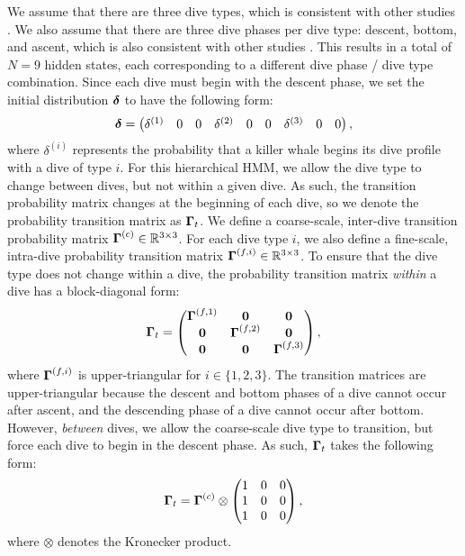 We assume that there are three dive types, which is consistent with other studies \citep[e.g.,][]{Barajas:2017}. We also assume that there are three dive phases per dive type: descent, bottom, and ascent, which is also consistent with other studies \citep[e.g.,][]{Vivant:2014}. This results in a total of $N = 9$ hidden states, each corresponding to a different dive phase / dive type combination.
%
Since each dive must begin with the descent phase, we set the initial distribution $\boldsymbol{\delta}$ to have the following form:
%
\begin{equation}
    \boldsymbol{\delta} = \begin{pmatrix} \delta^{(1)} & 0 & 0 & \delta^{(2)} & 0 & 0 & \delta^{(3)} & 0 & 0 \end{pmatrix},
    \label{eqn:delta_case_study}
\end{equation}
%
where $\delta^{(i)}$ represents the probability that a killer whale begins its dive profile with a dive of type $i$. 
%
For this hierarchical HMM, we allow the dive type to change between dives, but not within a given dive. As such, the transition probability matrix changes at the beginning of each dive, so we denote the probability transition matrix as $\boldsymbol{\Gamma}_t$. We define a coarse-scale, inter-dive transition probability matrix $\boldsymbol{\Gamma}^{(c)} \in \mathbb{R}^{3 \times 3}$. For each dive type $i$, we also define a fine-scale, intra-dive probability transition matrix $\boldsymbol{\Gamma}^{(f,i)} \in \mathbb{R}^{3 \times 3}$. 
%
To ensure that the dive type does not change within a dive, the probability transition matrix \textit{within} a dive has a block-diagonal form:
%
\begin{equation}
    \boldsymbol{\Gamma}_t = 
    \begin{pmatrix}
        \boldsymbol{\Gamma}^{(f,1)} & \mathbf{0} & \mathbf{0} \\
        \mathbf{0} & \boldsymbol{\Gamma}^{(f,2)} & \mathbf{0} \\
        \mathbf{0} & \mathbf{0} & \boldsymbol{\Gamma}^{(f,3)} \\
    \end{pmatrix},
\end{equation}
%
where $\boldsymbol{\Gamma}^{(f,i)}$ is upper-triangular for $i \in \{1,2,3\}$. The transition matrices are upper-triangular because the descent and bottom phases of a dive cannot occur after ascent, and the descending phase of a dive cannot occur after bottom.
%
However, \textit{between} dives, we allow the coarse-scale dive type to transition, but force each dive to begin in the descent phase. As such, $\boldsymbol{\Gamma}_t$ takes the following form:
%
\begin{equation}
    \boldsymbol{\Gamma}_t = \boldsymbol{\Gamma}^{(c)} \otimes \begin{pmatrix} 1 & 0 & 0 \\ 1 & 0 & 0 \\ 1 & 0 & 0 \end{pmatrix},
\end{equation}
%
where $\otimes$ denotes the Kronecker product.

